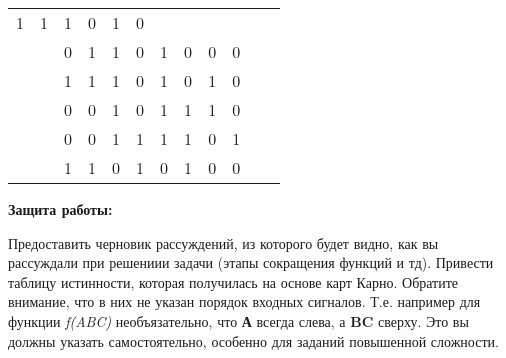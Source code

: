 \documentclass[12pt,a4paper,final,notitlepage]{article}
\begin{document}
\begin{table}[htbp]
\begin{minipage}{\textwidth}
\begin{tabular}{cccccccccccc}
  \multicolumn{1}{c|}{1} &
  \multicolumn{1}{c|}{1} &
  \multicolumn{1}{c|}{1} &
  \multicolumn{1}{c|}{0} &
  \multicolumn{1}{c|}{1} &
  \multicolumn{1}{c|}{0} &
   &
   \\ \cline{3-10}
 &
  \multicolumn{1}{c|}{} &
  \multicolumn{1}{c|}{0} &
  \multicolumn{1}{c|}{1} &
  \multicolumn{1}{c|}{1} &
  \multicolumn{1}{c|}{0} &
  \multicolumn{1}{c|}{1} &
  \multicolumn{1}{c|}{0} &
  \multicolumn{1}{c|}{0} &
  \multicolumn{1}{c|}{0} &
   &
   \\ \cline{3-10}
 &
  \multicolumn{1}{c|}{} &
  \multicolumn{1}{c|}{1} &
  \multicolumn{1}{c|}{1} &
  \multicolumn{1}{c|}{1} &
  \multicolumn{1}{c|}{0} &
  \multicolumn{1}{c|}{1} &
  \multicolumn{1}{c|}{0} &
  \multicolumn{1}{c|}{1} &
  \multicolumn{1}{c|}{0} &
   &
   \\ \cline{3-10}
 &
  \multicolumn{1}{c|}{} &
  \multicolumn{1}{c|}{0} &
  \multicolumn{1}{c|}{0} &
  \multicolumn{1}{c|}{1} &
  \multicolumn{1}{c|}{0} &
  \multicolumn{1}{c|}{1} &
  \multicolumn{1}{c|}{1} &
  \multicolumn{1}{c|}{1} &
  \multicolumn{1}{c|}{0} &
   &
   \\ \cline{3-10}
 &
  \multicolumn{1}{c|}{} &
  \multicolumn{1}{c|}{0} &
  \multicolumn{1}{c|}{0} &
  \multicolumn{1}{c|}{1} &
  \multicolumn{1}{c|}{1} &
  \multicolumn{1}{c|}{1} &
  \multicolumn{1}{c|}{1} &
  \multicolumn{1}{c|}{0} &
  \multicolumn{1}{c|}{1} &
   &
   \\ \cline{3-10}
 &
  \multicolumn{1}{c|}{} &
  \multicolumn{1}{c|}{1} &
  \multicolumn{1}{c|}{1} &
  \multicolumn{1}{c|}{0} &
  \multicolumn{1}{c|}{1} &
  \multicolumn{1}{c|}{0} &
  \multicolumn{1}{c|}{1} &
  \multicolumn{1}{c|}{0} &
  \multicolumn{1}{c|}{0} &
   &
   \\ \cline{3-10}
\end{tabular}
\end{minipage}
\end{table}

\textbf{Защита работы:} \\
\begin{flushleft}
\hspace*{15pt} Предоставить черновик рассуждений, из которого будет видно, как вы рассуждали при решениии задачи (этапы сокращения функций и тд). Привести таблицу истинности, которая получилась на основе карт Карно. Обратите внимание, что в них не указан порядок входных сигналов. Т.е. например для функции \textit{f(ABC)} необъязательно, что \textbf{А} всегда слева, а \textbf{BC} сверху. Это вы должны указать самостоятельно, особенно для заданий повышенной сложности.
\end{flushleft}
\end{document}
